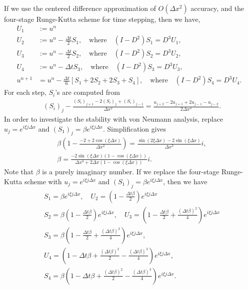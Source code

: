 If we use the centered difference approximation of $O(\Delta x^2)$
accuracy, and the four-stage Runge-Kutta scheme for time stepping,
then we have,
\begin{align*}
U_1 &:= u^n \\
U_2 &:= u^n - \frac{\Delta t}{2}S_1, \quad  \textrm{where}\quad 
(I-D^2)S_1 = D^3 U_1, \\
U_3 &:= u^n - \frac{\Delta t}{2}S_2, \quad  \textrm{where}\quad
(I-D^2)S_2 = D^3 U_2, \\
U_4 &:= u^n - \Delta tS_3, \quad  \textrm{where}\quad
(I-D^2)S_3 = D^3 U_3, \\
u^{n+1} & = u^n -\frac{\Delta t}{6} \left[
S_1 + 2S_2 + 2S_3 + S_4
\right],  \quad  \textrm{where}\quad
(I-D^2)S_4 = D^3 U_4.
\end{align*}
For each step, $S_i$'s are computed from
\begin{align*}
& (S_i)_j - \frac{(S_i)_{j+1}-2(S_i)_j+(S_i)_{j-1}}{\Delta x^2} = 
\frac{u_{j+2} - 2u_{j+1} +2u_{j-1} -u_{j-2}}{2\Delta x^3}.
\end{align*}
In order to investigate the stability with von Neumann analysis,
replace $u_j= e^{i\xi j \Delta x}$ and  $(S_1)_j= \beta e^{i\xi j \Delta x}$. 
Simplification gives
\begin{align*}
&\beta \left( 1 - \frac{-2+2\cos(\xi \Delta x) }{\Delta x^2} \right) = 
\frac{\sin(2\xi \Delta x) - 2 \sin(\xi \Delta x)}{\Delta x^3} i, \\
& \beta = \frac{ -2\sin(\xi \Delta x)(1-  \cos(\xi \Delta x)) }
                     { \Delta x^3 +2\Delta x(1-\cos(\xi \Delta x))} i.
\end{align*}
Note that $\beta$ is a purely imaginary number.
If we replace the four-stage Runge-Kutta scheme with
$u_j= e^{i\xi j \Delta x}$ and  $(S_1)_j= \beta e^{i\xi j \Delta x}$, then we have
\begin{align*}
&S_1 = \beta e^{i\xi j \Delta x} ,
 \quad U_2 = \left(1-\frac{\Delta t\beta}{2} \right) e^{i\xi j \Delta x}\\
&S_2 = \beta \left(1-\frac{\Delta t\beta}{2} \right) e^{i\xi j \Delta x} ,
 \quad U_3 = \left(1- \frac{\Delta t\beta}{2}+\frac{(\Delta t\beta)^2}{4} \right) e^{i\xi j \Delta x}\\
&S_3 =  \beta\left(1- \frac{\Delta t\beta}{2}+\frac{(\Delta t\beta)^2}{4} \right)  e^{i\xi j \Delta x} , \\
& U_4 = \left(1-\Delta t\beta
+ \frac{(\Delta t\beta)^2}{2}-\frac{(\Delta t\beta)^3}{4} \right) e^{i\xi j \Delta x},\\
&S_4 = \beta \left(1-\Delta t\beta
+ \frac{(\Delta t\beta)^2}{2}-\frac{(\Delta t\beta)^3}{4} \right) e^{i\xi j \Delta x}.
\end{align*}
